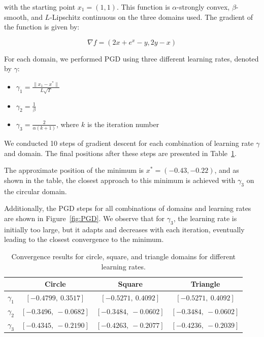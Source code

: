 \documentclass[9pt]{IEEEtran}
\begin{document}
with the starting point \( x_1 = (1,1) \). This function is \(\alpha\)-strongly convex, \(\beta\)-smooth, and \(L\)-Lipschitz continuous on the three domains used. The gradient of the function is given by:

\[
\nabla f = (2x + e^x - y, 2y - x)
\]

For each domain, we performed PGD using three different learning rates, denoted by \(\gamma\):

\begin{itemize}
    \item \(\gamma_1 = \frac{\| x_1 - x^* \|}{ L\sqrt{T}}\)
    \item \(\gamma_2 = \frac{1}{\beta}\)
    \item \(\gamma_3 = \frac{2}{\alpha(k+1)}\), where \(k\) is the iteration number
\end{itemize}

We conducted 10 steps of gradient descent for each combination of learning rate \(\gamma\) and domain. The final positions after these steps are presented in Table~\ref{tab:results}. 

The approximate position of the minimum is \(x^* = (-0.43, -0.22)\), and as shown in the table, the closest approach to this minimum is achieved with \(\gamma_3\) on the circular domain.

Additionally, the PGD steps for all combinations of domains and learning rates are shown in Figure~\ref{fig:PGD}. We observe that for \(\gamma_3\), the learning rate is initially too large, but it adapts and decreases with each iteration, eventually leading to the closest convergence to the minimum.


\begin{table}[H]
    \centering
    \begin{tabular}{c|c|c|c}
     & \textbf{Circle} & \textbf{Square} & \textbf{Triangle} \\
    \hline
    $\gamma_1$ & $[-0.4799,\ 0.3517]$ & $[-0.5271,\ 0.4092]$ & $[-0.5271,\ 0.4092]$ \\
    $\gamma_2$ & $[-0.3496,\ -0.0682]$ & $[-0.3484,\ -0.0602]$ & $[-0.3484,\ -0.0602]$ \\
    $\gamma_3$ & $[-0.4345,\ -0.2190]$ & $[-0.4263,\ -0.2077]$ & $[-0.4236,\ -0.2039]$ \\
    \end{tabular}
    \caption{Convergence results for circle, square, and triangle domains for different learning rates.}
    \label{tab:results}
\end{table}
\end{document}
